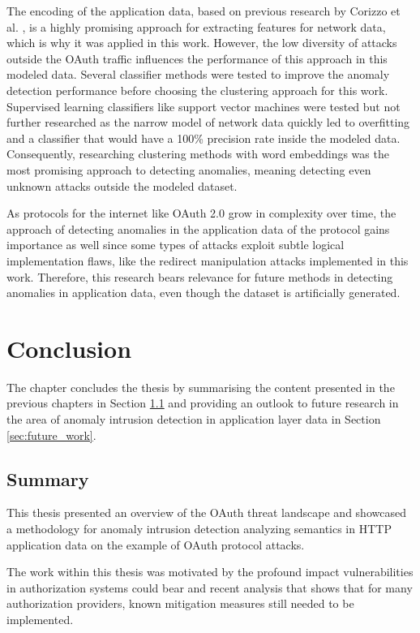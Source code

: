 \documentclass[
    fontsize=12pt,
    headings=small,
    parskip=half,           %
    bibliography=totoc,
    numbers=noenddot,       %
    open=any,               %
    ]{scrreprt}
\begin{document}
The encoding of the application data, based on previous research by Corizzo et al. \cite{corizzo2020feature}, is a highly promising approach for extracting features for network data, which is why it was applied in this work. However, the low diversity of attacks outside the OAuth traffic influences the performance of this approach in this modeled data. Several classifier methods were tested to improve the anomaly detection performance before choosing the clustering approach for this work. Supervised learning classifiers like support vector machines were tested but not further researched as the narrow model of network data quickly led to overfitting and a classifier that would have a 100\% precision rate inside the modeled data. Consequently, researching clustering methods with word embeddings was the most promising approach to detecting anomalies, meaning detecting even unknown attacks outside the modeled dataset.

As protocols for the internet like OAuth 2.0 grow in complexity over time, the approach of detecting anomalies in the application data of the protocol gains importance as well since some types of attacks exploit subtle logical implementation flaws, like the redirect manipulation attacks implemented in this work. Therefore, this research bears relevance for future methods in detecting anomalies in application data, even though the dataset is artificially generated.


\chapter{Conclusion}
\label{chap:conclusion}

The chapter concludes the thesis by summarising the content presented in the previous chapters in Section \ref{sec:summary}  and providing an outlook to future research in the area of anomaly intrusion detection in application layer data in Section \ref{sec:future_work}.

\section{Summary}
\label{sec:summary}
This thesis presented an overview of the OAuth threat landscape and showcased a methodology for anomaly intrusion detection analyzing semantics in HTTP application data on the example of OAuth protocol attacks.

The work within this thesis was motivated by the profound impact vulnerabilities in authorization systems could bear and recent analysis that shows that for many authorization providers, known mitigation measures still needed to be implemented.
\end{document}
